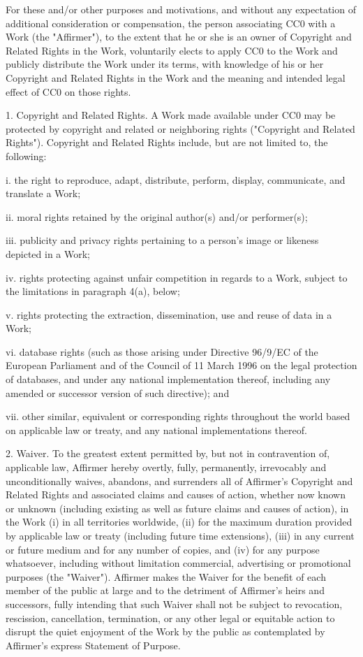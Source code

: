 \documentclass[a4paper,12pt]{article}
\begin{document}
\begin{appendices}
For these and/or other purposes and motivations, and without any
expectation of additional consideration or compensation, the person
associating CC0 with a Work (the "Affirmer"), to the extent that he or she
is an owner of Copyright and Related Rights in the Work, voluntarily
elects to apply CC0 to the Work and publicly distribute the Work under its
terms, with knowledge of his or her Copyright and Related Rights in the
Work and the meaning and intended legal effect of CC0 on those rights.

1. Copyright and Related Rights. A Work made available under CC0 may be
protected by copyright and related or neighboring rights ("Copyright and
Related Rights"). Copyright and Related Rights include, but are not
limited to, the following:

  i. the right to reproduce, adapt, distribute, perform, display,
     communicate, and translate a Work;
     
 ii. moral rights retained by the original author(s) and/or performer(s);
 
iii. publicity and privacy rights pertaining to a person's image or
     likeness depicted in a Work;
     
 iv. rights protecting against unfair competition in regards to a Work,
     subject to the limitations in paragraph 4(a), below;
     
  v. rights protecting the extraction, dissemination, use and reuse of data in a Work;
  
 vi. database rights (such as those arising under Directive 96/9/EC of the
     European Parliament and of the Council of 11 March 1996 on the legal
     protection of databases, and under any national implementation
     thereof, including any amended or successor version of such
     directive); and
     
vii. other similar, equivalent or corresponding rights throughout the
     world based on applicable law or treaty, and any national
     implementations thereof.

2. Waiver. To the greatest extent permitted by, but not in contravention
of, applicable law, Affirmer hereby overtly, fully, permanently,
irrevocably and unconditionally waives, abandons, and surrenders all of
Affirmer's Copyright and Related Rights and associated claims and causes
of action, whether now known or unknown (including existing as well as
future claims and causes of action), in the Work (i) in all territories
worldwide, (ii) for the maximum duration provided by applicable law or
treaty (including future time extensions), (iii) in any current or future
medium and for any number of copies, and (iv) for any purpose whatsoever,
including without limitation commercial, advertising or promotional
purposes (the "Waiver"). Affirmer makes the Waiver for the benefit of each
member of the public at large and to the detriment of Affirmer's heirs and
successors, fully intending that such Waiver shall not be subject to
revocation, rescission, cancellation, termination, or any other legal or
equitable action to disrupt the quiet enjoyment of the Work by the public
as contemplated by Affirmer's express Statement of Purpose.


\end{appendices}
\end{document}
